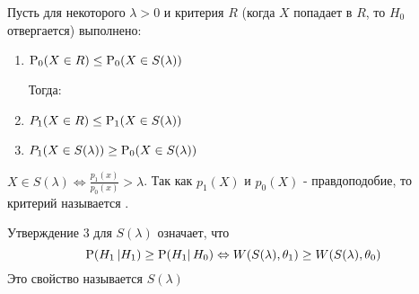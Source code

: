 \begin{theorem*}
    Пусть для некоторого \(\lambda > 0\) и критерия \(R\)
    (когда \(X\) попадает в \(R\), то \(H_0\) отвергается)
    выполнено:
    \begin{enumerate}
        \item  \(\P_0(X\in R) \leq \P_0(X\in S(\lambda))\)

        Тогда:
        \item  \(P_1(X\in R) \leq \P_1(X\in S(\lambda))\)
        \item  \(P_1(X\in S(\lambda)) \geq \P_0(X\in S(\lambda))\)
    \end{enumerate}
\end{theorem*}
\begin{remark}
    \(X\in S(\lambda) \Leftrightarrow \frac{p_1(x)}{p_0(x)} > \lambda\).
    Так как \(p_1(X)\) и \(p_0(X)\) - правдоподобие, то критерий
    называется .
\end{remark}
\begin{remark}
    Утверждение 3 для \(S(\lambda)\) означает, что
    \[\P(H_1 \left\lvert  H_1) \geq \P(H_1 \right\rvert H_0) \Leftrightarrow W(S(\lambda), \theta_1) \geq W(S(\lambda), \theta_0)\]
    Это свойство называется  \(S(\lambda)\)
\end{remark}
